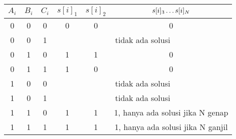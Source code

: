 \documentclass[../main_editorial.tex]{subfiles} %
\begin{document}
\begin{table}[]
\centering
\begin{tabular}{|c|c|c|c|c|c|}
\hline
$ A_i $ & $ B_i $ & $ C_i $ & $ s[i]_1 $ & $ s[i]_2 $ & $ s[i]_3 \mathellipsis s[i]_N $       \\ \hline
0    & 0    & 0    & 0           & 0           & 0                                 \\ \hline
0    & 0    & 1    & \multicolumn{3}{c|}{tidak ada solusi}                          \\ \hline
0    & 1    & 0    & 1           & 1           & 0                                 \\ \hline
0    & 1    & 1    & 1           & 0           & 0                                 \\ \hline
1    & 0    & 0    & \multicolumn{3}{c|}{tidak ada solusi}                          \\ \hline
1    & 0    & 1    & \multicolumn{3}{c|}{tidak ada solusi}                          \\ \hline
1    & 1    & 0    & 1           & 1           & 1, hanya ada solusi jika N genap  \\ \hline
1    & 1    & 1    & 1           & 1           & 1, hanya ada solusi jika N ganjil \\ \hline
\end{tabular}
\end{table}
\end{document}
